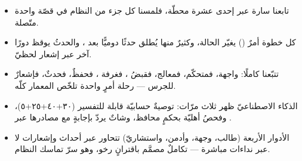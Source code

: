 \begin{summary}
\begin{itemize}
\item تابعنا سارة عبر إحدى عشرة محطّة، فلمسنا كل جزء من النظام في قصّة واحدة متّصلة.
\item كل خطوة أمرٌ () يغيّر الحالة، وكثيرٌ منها يُطلق حدثًا دوميًّا بعد
، والحدثُ يوقظ دورًا آخر عبر إشعار لحظيّ.
\item تتبّعنا  كاملًا: واجهة، فمتحكّم، فمعالج، فقبضُ ،
فغرفة ، فحفظٌ، فحدثٌ، فإشعارٌ للجرس — رحلة أمرٍ واحدة تلخّص المعمار كلّه.
\item الذكاء الاصطناعيّ ظهر ثلاث مرّات: توصيةٌ حسابيّة قابلة للتفسير (٣٠+٤٠+٢٥+٥)،
وفحصُ أهليّة بحكمٍ محافظ، وشاتٌ يردّ بإجابةٍ مع مصادرها عبر .
\item الأدوار الأربعة (طالب، وجهة، وأدمن، واستشاريّ) تتحاور عبر أحداث وإشعارات لا عبر
نداءات مباشرة — تكاملٌ مصمَّم باقترانٍ رخو، وهو سرّ تماسك النظام.
\end{itemize}
\end{summary}
